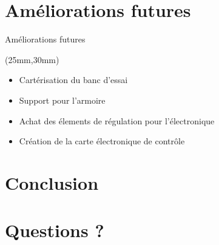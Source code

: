 \documentclass[10pt]{beamer}
\begin{document}
	\section{Améliorations futures}

	\begin{frame}{Améliorations futures}
		
		\begin{textblock*}{100mm}(25mm,30mm)
			\begin{itemize}
				\item Cartérisation du banc d'essai
				\item Support pour l'armoire
				\item Achat des élements de régulation pour l'électronique
				\item Création de la carte électronique de contrôle
 			\end{itemize}
		\end{textblock*}
		
	\end{frame}

	\section{Conclusion}
	\section{Questions ?}
\end{document}
